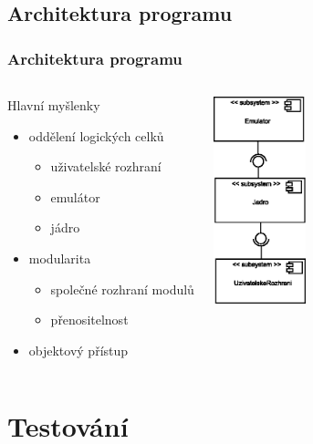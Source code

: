 \documentclass[10pt]{beamer}
\begin{document}
\subsection{Architektura programu}
\begin{frame}
\frametitle{Architektura programu}
\begin{columns}
	\begin{block}{Hlavní myšlenky}
	\begin{itemize}
		\item oddělení logických celků
		\begin{itemize}
			\item uživatelské rozhraní
			\item emulátor
			\item jádro
		\end{itemize}
		\item modularita
		\begin{itemize}
			\item společné rozhraní modulů
			\item přenositelnost
		\end{itemize}
		\item objektový přístup
	\end{itemize}
	\end{block}
	\begin{center}
		\includegraphics[height=6cm]{fig/anal_kompo}
	\end{center}
\end{columns}
\end{frame}

\section{Testování}
\end{document}
